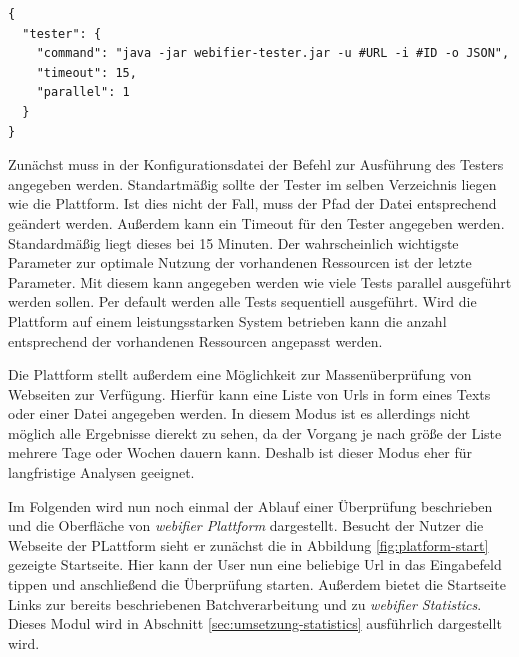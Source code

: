 \begin{scriptsize}
\begin{lstlisting}
{
  "tester": {
    "command": "java -jar webifier-tester.jar -u #URL -i #ID -o JSON",
    "timeout": 15,
    "parallel": 1
  }
}
\end{lstlisting}
\end{scriptsize}

Zunächst muss in der Konfigurationsdatei der Befehl zur Ausführung des Testers angegeben werden. Standartmäßig sollte der Tester im selben Verzeichnis liegen wie die Plattform. Ist dies nicht der Fall, muss der Pfad der Datei entsprechend geändert werden. Außerdem kann ein Timeout für den Tester angegeben werden. Standardmäßig liegt dieses bei 15 Minuten. Der wahrscheinlich wichtigste Parameter zur optimale Nutzung der vorhandenen Ressourcen ist der letzte Parameter. Mit diesem kann angegeben werden wie viele Tests parallel ausgeführt werden sollen. Per default werden alle Tests sequentiell ausgeführt. Wird die Plattform auf einem leistungsstarken System betrieben kann die anzahl entsprechend der vorhandenen Ressourcen angepasst werden.

Die Plattform stellt außerdem eine Möglichkeit zur Massenüberprüfung von Webseiten zur Verfügung. Hierfür kann eine Liste von Urls in form eines Texts oder einer Datei angegeben werden. In diesem Modus ist es allerdings nicht möglich alle Ergebnisse dierekt zu sehen, da der Vorgang je nach größe der Liste mehrere Tage oder Wochen dauern kann. Deshalb ist dieser Modus eher für langfristige Analysen geeignet.

Im Folgenden wird nun noch einmal der Ablauf einer Überprüfung beschrieben und die Oberfläche von
\textit{webifier Plattform} dargestellt. Besucht der Nutzer die Webseite der PLattform sieht er
zunächst die in Abbildung \ref{fig:platform-start} gezeigte Startseite. Hier kann der User nun eine
beliebige Url in das Eingabefeld tippen und anschließend die Überprüfung starten. Außerdem bietet
die Startseite Links zur bereits beschriebenen Batchverarbeitung und zu \textit{webifier Statistics}. Dieses Modul wird in Abschnitt \ref{sec:umsetzung-statistics} ausführlich dargestellt wird.

